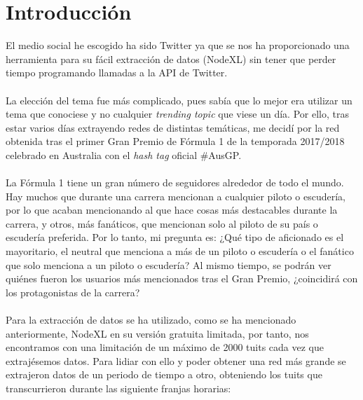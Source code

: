 	
	
	
\setcounter{page}{0}

\maketitle %
\thispagestyle{empty}

\newpage %

\tableofcontents %


\newpage


\section{Introducción}

El medio social he escogido ha sido Twitter ya que se nos ha proporcionado una herramienta para su fácil extracción de datos (NodeXL) sin tener que perder tiempo programando llamadas a la API de Twitter.
\\ \\
La elección del tema fue más complicado, pues sabía que lo mejor era utilizar un tema que conociese y no cualquier \textit{trending topic} que viese un día. Por ello, tras estar varios días extrayendo redes de distintas temáticas, me decidí por la red obtenida tras el primer Gran Premio de Fórmula 1 de la temporada 2017/2018 celebrado en Australia con el \textit{hash tag} oficial \#AusGP.
\\ \\
La Fórmula 1 tiene un gran número de seguidores alrededor de todo el mundo. Hay muchos que durante una carrera mencionan a cualquier piloto o escudería, por lo que acaban mencionando al que hace cosas más destacables durante la carrera, y otros, más fanáticos, que mencionan solo al piloto de su país o escudería preferida. Por lo tanto, mi pregunta es: ¿Qué tipo de aficionado es el mayoritario, el neutral que menciona a más de un piloto o escudería o el fanático que solo menciona a un piloto o escudería? Al mismo tiempo, se podrán ver quiénes fueron los usuarios más mencionados tras el Gran Premio, ¿coincidirá con los protagonistas de la carrera?
\\ \\
Para la extracción de datos se ha utilizado, como se ha mencionado anteriormente, NodeXL en su versión gratuita limitada, por tanto, nos encontramos con una limitación de un máximo de 2000 tuits cada vez que extrajésemos datos. Para lidiar con ello y poder obtener una red más grande se extrajeron datos de un periodo de tiempo a otro, obteniendo los tuits que transcurrieron durante las siguiente franjas horarias:

